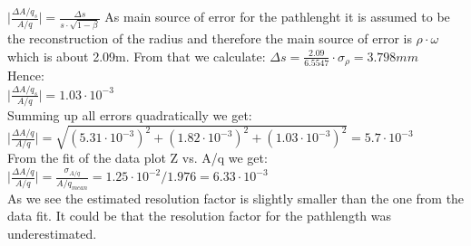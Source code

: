 \documentclass[12pt, letterpaper]{article}
\begin{document}
$\big|\frac{\Delta A/q_{s}}{A/q}\big| = \frac{\Delta s}{s\cdot \sqrt{1- \beta}}$
As main source of error for the pathlenght it is assumed to be the reconstruction of the radius and therefore the main source of error is $\rho \cdot \omega$ which is about 2.09m. From that we calculate: 
$\Delta s = \frac{2.09}{6.5547}\cdot \sigma_{\rho} = 3.798mm $ \\
Hence:\\
$\big|\frac{\Delta A/q_{s}}{A/q}\big| = 1.03 \cdot 10^{-3}$\\
\newline
Summing up all errors quadratically we get:\\
$\Big|\frac{\Delta A/q}{A/q}\Big| = \sqrt{ (5.31\cdot 10^{-3})^{2} + (1.82 \cdot 10^{-3})^{2} + (1.03 \cdot 10^{-3})^{2}} = 5.7 \cdot 10^{-3}$ \\ 
\newline
From the fit of the data plot Z vs. A/q we get:\\
$\Big|\frac{\Delta A/q}{A/q}\Big| = \frac{\sigma_{A/q}}{A/q_{mean}} = 1.25 \cdot 10^{-2}/1.976 = 6.33 \cdot 10^{-3}$\\
\newline
As we see the estimated resolution factor is slightly smaller than the one from the data fit. It could be that the resolution factor for the pathlength was underestimated.\\


 
\end{document}

